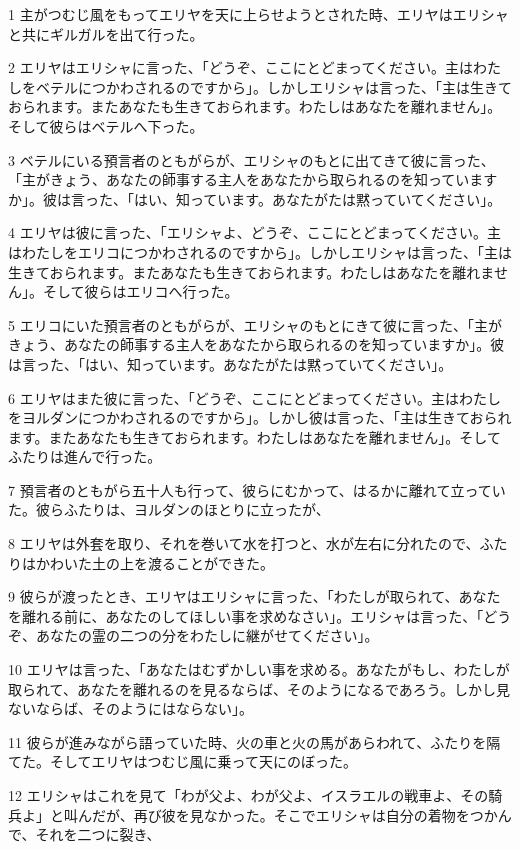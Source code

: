 \par 1 主がつむじ風をもってエリヤを天に上らせようとされた時、エリヤはエリシャと共にギルガルを出て行った。
\par 2 エリヤはエリシャに言った、「どうぞ、ここにとどまってください。主はわたしをベテルにつかわされるのですから」。しかしエリシャは言った、「主は生きておられます。またあなたも生きておられます。わたしはあなたを離れません」。そして彼らはベテルへ下った。
\par 3 ベテルにいる預言者のともがらが、エリシャのもとに出てきて彼に言った、「主がきょう、あなたの師事する主人をあなたから取られるのを知っていますか」。彼は言った、「はい、知っています。あなたがたは黙っていてください」。
\par 4 エリヤは彼に言った、「エリシャよ、どうぞ、ここにとどまってください。主はわたしをエリコにつかわされるのですから」。しかしエリシャは言った、「主は生きておられます。またあなたも生きておられます。わたしはあなたを離れません」。そして彼らはエリコへ行った。
\par 5 エリコにいた預言者のともがらが、エリシャのもとにきて彼に言った、「主がきょう、あなたの師事する主人をあなたから取られるのを知っていますか」。彼は言った、「はい、知っています。あなたがたは黙っていてください」。
\par 6 エリヤはまた彼に言った、「どうぞ、ここにとどまってください。主はわたしをヨルダンにつかわされるのですから」。しかし彼は言った、「主は生きておられます。またあなたも生きておられます。わたしはあなたを離れません」。そしてふたりは進んで行った。
\par 7 預言者のともがら五十人も行って、彼らにむかって、はるかに離れて立っていた。彼らふたりは、ヨルダンのほとりに立ったが、
\par 8 エリヤは外套を取り、それを巻いて水を打つと、水が左右に分れたので、ふたりはかわいた土の上を渡ることができた。
\par 9 彼らが渡ったとき、エリヤはエリシャに言った、「わたしが取られて、あなたを離れる前に、あなたのしてほしい事を求めなさい」。エリシャは言った、「どうぞ、あなたの霊の二つの分をわたしに継がせてください」。
\par 10 エリヤは言った、「あなたはむずかしい事を求める。あなたがもし、わたしが取られて、あなたを離れるのを見るならば、そのようになるであろう。しかし見ないならば、そのようにはならない」。
\par 11 彼らが進みながら語っていた時、火の車と火の馬があらわれて、ふたりを隔てた。そしてエリヤはつむじ風に乗って天にのぼった。
\par 12 エリシャはこれを見て「わが父よ、わが父よ、イスラエルの戦車よ、その騎兵よ」と叫んだが、再び彼を見なかった。そこでエリシャは自分の着物をつかんで、それを二つに裂き、

